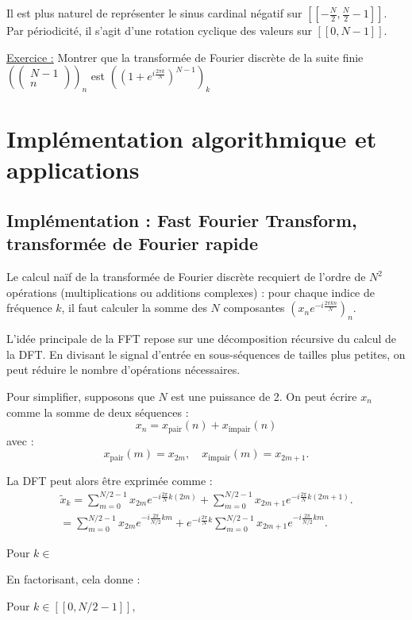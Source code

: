 \documentclass[11pt,oneside]{article}
\begin{document}
Il est plus naturel de représenter le sinus cardinal négatif sur $[\![-\frac{N}{2},\frac{N}{2} - 1]\!]$. Par périodicité, il s'agit d'une rotation cyclique des valeurs sur $[\![0,N-1]\!]$.

\underline{Exercice :}
Montrer que la transformée de Fourier discrète de la suite finie $( \begin{pmatrix}
N-1 \\
n
\end{pmatrix})_n$ est $((1+e^{i\frac{2 \pi k}{N}})^{N-1})_k$

\section{Implémentation algorithmique et applications}


\subsection{Implémentation : Fast Fourier Transform, transformée de Fourier rapide}


Le calcul naïf de la transformée de Fourier discrète recquiert de l'ordre de $N^2$ opérations (multiplications ou additions complexes) : pour chaque indice de fréquence $k$, il faut calculer la somme des $N$ composantes $(x_n e^{-i\frac{2\pi kn}{N}})_n$.

L'idée principale de la FFT repose sur une décomposition récursive du calcul de la DFT. En divisant le signal d'entrée en sous-séquences de tailles plus petites, on peut réduire le nombre d'opérations nécessaires.

Pour simplifier, supposons que $N$ est une puissance de 2. On peut écrire $x_n$ comme la somme de deux séquences :
\[
x_n = x_{\text{pair}}(n) + x_{\text{impair}}(n)
\]
avec :
\[
x_{\text{pair}}(m) = x_{2m}, \quad x_{\text{impair}}(m) = x_{2m+1}.
\]

La DFT peut alors être exprimée comme :
\begin{align*}
\tilde x_k = \sum_{m=0}^{N/2-1} x_{2m} e^{-i \frac{2\pi}{N} k(2m)} + \sum_{m=0}^{N/2-1} x_{2m+1} e^{-i \frac{2\pi}{N} k(2m+1)}.
\\ = \sum_{m=0}^{N/2-1} x_{2m} e^{-i \frac{2\pi}{N/2} km} + e^{-i \frac{2\pi}{N} k} \sum_{m=0}^{N/2-1} x_{2m+1} e^{-i \frac{2\pi}{N/2} km}.
\end{align*}


Pour $k \in $

En factorisant, cela donne :

Pour $k \in [\![0,N/2-1]\!]$,
\end{document}
